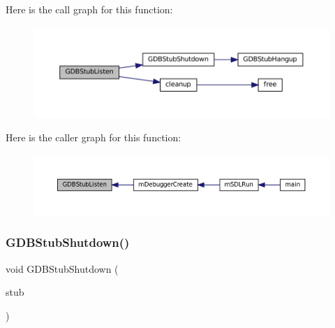 Here is the call graph for this function\+:
\nopagebreak
\begin{figure}[H]
\begin{center}
\leavevmode
\includegraphics[width=350pt]{gdb-stub_8c_a0ccf43b868dd63e4eb34e327a7b16816_cgraph}
\end{center}
\end{figure}
Here is the caller graph for this function\+:
\nopagebreak
\begin{figure}[H]
\begin{center}
\leavevmode
\includegraphics[width=350pt]{gdb-stub_8c_a0ccf43b868dd63e4eb34e327a7b16816_icgraph}
\end{center}
\end{figure}
\mbox{\label{gdb-stub_8c_abe19ef8bb5b906d431db62458f3b5c5f}} 
\subsubsection{\texorpdfstring{G\+D\+B\+Stub\+Shutdown()}{GDBStubShutdown()}}
{\footnotesize\ttfamily void G\+D\+B\+Stub\+Shutdown (\begin{DoxyParamCaption}\item[{struct G\+D\+B\+Stub $\ast$}]{stub }\end{DoxyParamCaption})}

